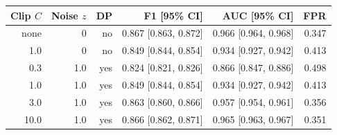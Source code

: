 \begin{tabular}{rrrrrr}
\toprule
Clip $C$ & Noise $z$ & DP & F1 [95\% CI] & AUC [95\% CI] & FPR \\
\midrule
none & 0 & no & 0.867 [0.863, 0.872] & 0.966 [0.964, 0.968] & 0.347 \\
1.0 & 0 & no & 0.849 [0.844, 0.854] & 0.934 [0.927, 0.942] & 0.413 \\
0.3 & 1.0 & yes & 0.824 [0.821, 0.826] & 0.866 [0.847, 0.886] & 0.498 \\
1.0 & 1.0 & yes & 0.849 [0.844, 0.854] & 0.934 [0.927, 0.942] & 0.413 \\
3.0 & 1.0 & yes & 0.863 [0.860, 0.866] & 0.957 [0.954, 0.961] & 0.356 \\
10.0 & 1.0 & yes & 0.866 [0.862, 0.871] & 0.965 [0.963, 0.967] & 0.351 \\
\bottomrule
\end{tabular}
